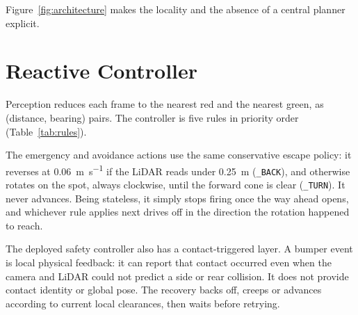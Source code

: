 \documentclass[conference,a4paper]{IEEEtran}
\begin{document}
Figure~\ref{fig:architecture} makes the locality and the absence of a central
planner explicit.

\section{Reactive Controller}
Perception reduces each frame to the nearest red and the nearest green, as
(distance, bearing) pairs. The controller is five rules in priority order
(Table~\ref{tab:rules}).

\begin{table}[t]
\caption{Rules, in evaluation order. First match wins.}
\label{tab:rules}
\centering
\footnotesize
{}
\end{table}

The emergency and avoidance actions use the same conservative escape policy:
it reverses at
\SI{0.06}{\metre\per\second} if the LiDAR reads under \SI{0.25}{\metre}
(\texttt{\_BACK}), and otherwise rotates on the spot, always clockwise, until
the forward cone is clear (\texttt{\_TURN}). It never advances. Being
stateless, it simply stops firing once the way ahead opens, and whichever
rule applies next drives off in the direction the rotation happened to reach.

The deployed safety controller also has a contact-triggered layer. A bumper
event is local physical feedback: it can report that contact occurred even
when the camera and LiDAR could not predict a side or rear collision. It does
not provide contact identity or global pose. The recovery backs off, creeps or
advances according to current local clearances, then waits before retrying.
\end{document}
